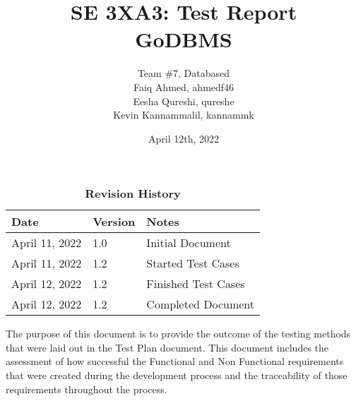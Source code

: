 \documentclass[12pt, titlepage]{article}
\title{SE 3XA3: Test Report\\GoDBMS}
\author{Team \#7, Databased
		\\ Faiq Ahmed, ahmedf46
		\\ Eesha Qureshi, qureshe
		\\ Kevin Kannammalil, kannammk
}
\date{April 12th, 2022}
\begin{document}
\maketitle

\tableofcontents
\listoftables
\listoffigures

\begin{table}[H]
\caption{\bf Revision History}
\begin{tabularx}{\textwidth}{p{3cm}p{2cm}X}
\toprule {\bf Date} & {\bf Version} & {\bf Notes}\\
\midrule
April 11, 2022 & 1.0 & Initial Document \\
April 11, 2022 & 1.2 & Started Test Cases \\
April 12, 2022 & 1.2 & Finished Test Cases \\
April 12, 2022 & 1.2 & Completed Document \\
\bottomrule
\end{tabularx}
\end{table}

\newpage



The purpose of this document is to provide the outcome of the testing methods that were laid out in the Test Plan document. This document includes the assessment of how successful the Functional and Non Functional requirements that were created during the development process and the traceability of those requirements throughout the process.

	
\end{document}
